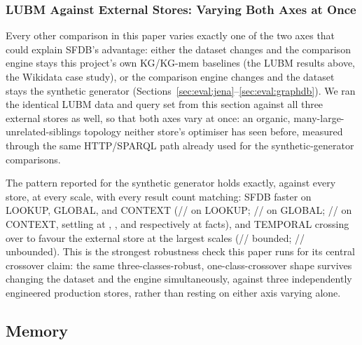 \subsubsection{LUBM Against External Stores: Varying Both Axes at Once}
\label{sec:eval:lubm-external}

Every other comparison in this paper varies exactly one of the two
axes that could explain SFDB's advantage: either the dataset changes
and the comparison engine stays this project's own KG/KG-mem baselines
(the LUBM results above, the Wikidata case study), or the comparison
engine changes and the dataset stays the synthetic generator
(Sections~\ref{sec:eval:jena}--\ref{sec:eval:graphdb}). We ran the
identical LUBM data and query set from this section against all three
external stores as well, so that both axes vary at once: an organic,
many-large-unrelated-siblings topology neither store's optimiser has
seen before, measured through the same HTTP/SPARQL path already used
for the synthetic-generator comparisons.





The pattern reported for the synthetic generator holds exactly, against
every store, at every scale, with every result count matching: SFDB
faster on LOOKUP, GLOBAL, and CONTEXT
(\rangelookuplubmjena{}/\rangelookuplubmvirtuoso{}/\rangelookuplubmgraphdb{}
on LOOKUP; \rangegloballubmjena{}/\rangegloballubmvirtuoso{}/\rangegloballubmgraphdb{}
on GLOBAL; \rangecontextlubmjena{}/\rangecontextlubmvirtuoso{}/\rangecontextlubmgraphdb{}
on CONTEXT, settling at \contextlubmjenalarge{}, \contextlubmvirtuosolarge{},
and \contextlubmgraphdblarge{} respectively at \lubmjenalargescale{} facts),
and TEMPORAL crossing over to favour the external store at the largest
scales (\rangetemporallubmjena{}/\rangetemporallubmvirtuoso{}/\rangetemporallubmgraphdb{}
bounded; \rangetemporalunblubmjena{}/\rangetemporalunblubmvirtuoso{}/\rangetemporalunblubmgraphdb{}
unbounded). This is the strongest robustness check this paper runs for
its central crossover claim: the same three-classes-robust,
one-class-crossover shape survives changing the dataset and the engine
simultaneously, against three independently engineered production
stores, rather than resting on either axis varying alone.

\subsection{Memory}
\label{sec:eval:memory}

